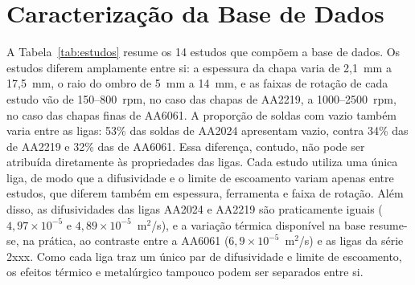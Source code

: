 \documentclass[12pt,openany]{report}
\begin{document}
\section{Caracterização da Base de Dados}
\label{sec:caracterizacao}

A Tabela~\ref{tab:estudos} resume os 14 estudos que compõem a base de dados. Os estudos diferem amplamente entre si: a espessura da chapa varia de 2,1~mm a 17,5~mm, o raio do ombro de 5~mm a 14~mm, e as faixas de rotação de cada estudo vão de 150--800~rpm, no caso das chapas de AA2219, a 1000--2500~rpm, no caso das chapas finas de AA6061. A proporção de soldas com vazio também varia entre as ligas: 53\% das soldas de AA2024 apresentam vazio, contra 34\% das de AA2219 e 32\% das de AA6061. Essa diferença, contudo, não pode ser atribuída diretamente às propriedades das ligas. Cada estudo utiliza uma única liga, de modo que a difusividade e o limite de escoamento variam apenas entre estudos, que diferem também em espessura, ferramenta e faixa de rotação. Além disso, as difusividades das ligas AA2024 e AA2219 são praticamente iguais ($4{,}97 \times 10^{-5}$ e $4{,}89 \times 10^{-5}$~m$^{2}$/s), e a variação térmica disponível na base resume-se, na prática, ao contraste entre a AA6061 ($6{,}9 \times 10^{-5}$~m$^{2}$/s) e as ligas da série 2xxx. Como cada liga traz um único par de difusividade e limite de escoamento, os efeitos térmico e metalúrgico tampouco podem ser separados entre si.
\end{document}
